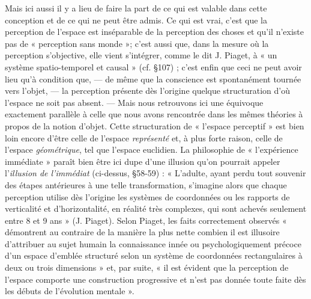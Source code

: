 Mais ici aussi il y a lieu de faire la part de ce qui est valable dans
cette conception et de ce qui ne peut être admis. Ce qui est vrai, c’est
que la perception de l’espace est inséparable de la perception des
choses et qu’il n’existe pas de « perception sans monde »; c’est aussi
que, dans la mesure où la perception s’objective, elle vient s’intégrer,
comme le dit J. Piaget, à « un système spatio-temporel et causal »
(cf. \S107) ; c’est enfin que ceci ne peut avoir lieu qu’à condition que,
— de même que la conscience est spontanément tournée vers l’objet,
— la perception présente dès l’origine quelque structuration d’où
l'espace ne soit pas absent. — Mais nous retrouvons ici une équivoque
exactement parallèle à celle que nous avons rencontrée dans les
mêmes théories à propos de la notion d’objet. Cette structuration de
« l’espace perceptif » est bien loin encore d’être celle de l’espace {\it représenté}
et, à plus forte raison, celle de l’espace {\it géométrique}, tel que
l'espace euclidien. La philosophie de « l'expérience immédiate » paraît
bien être ici dupe d’une illusion qu’on pourrait appeler l’{\it illusion de
l'immédiat} (ci-dessus, \S 58-59) : « L’adulte, ayant perdu tout souvenir
des étapes antérieures à une telle transformation, s’imagine alors que
chaque perception utilise dès l'origine les systèmes de coordonnées ou
les rapports de verticalité et d’horizontalité, en réalité très complexes,
qui sont achevés seulement entre 8 et 9 ans » (J. Piaget). Selon
Piaget, les faits correctement observés « démontrent au contraire de
la manière la plus nette combien il est illusoire d’attribuer au sujet
humain la connaissance innée ou psychologiquement précoce d’un
espace d’emblée structuré selon un système de coordonnées rectangulaires
à deux ou trois dimensions » et, par suite, « il est évident que
la perception de l’espace comporte une construction progressive et
n’est pas donnée toute faite dès les débuts de l’évolution mentale ».

